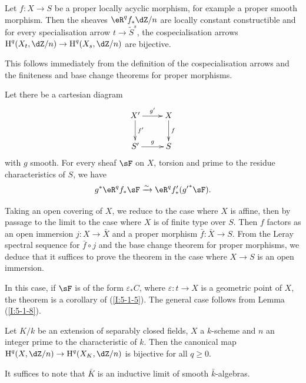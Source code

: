 \begin{theorem}\label{I:5-3-1}
Let $f:X\to S$ be a proper locally acyclic morphism, for example a
proper smooth morphism. Then the sheaves $\eR^q f_*\dZ/n$ are locally
constant constructible and for every specialisation arrow
$t\to\widetilde S^s$, the cospecialisation arrows
$\h^q(X_t,\dZ/n)\to\h^q(X_s,\dZ/n)$ are bijective.
\end{theorem}

This follows immediately from the definition of the
cospecialisation arrows and the finiteness and base change theorems for
proper morphisms. 





\begin{theorem}\label{I:5-3-2}
Let there be a cartesian diagram
\[\xymatrix{
  X' \ar[r]^-{g'} \ar[d]^-{f'}
    & X \ar[d]^-f \\
  S' \ar[r]^-{g}
    & S
}\]
with $g$ smooth. For every sheaf $\sF$ on $X$, torsion and prime to the
residue characteristics of $S$, we have
\[
  g^* \eR^q f_* \sF \iso \eR^q f_*'({g'}^* \sF) \text{.}
\]
\end{theorem}

Taking an open covering of $X$, we reduce to the case where $X$ is
affine, then by passage to the limit to the case where $X$ is of finite type
over $S$. Then $f$ factors as an open immersion $j:X\to \bar X$ and a
proper morphism $\bar f:\bar X\to S$. From the Leray spectral sequence for
$\bar f\circ j$ and the base change theorem for proper morphisms,
we deduce that it suffices to prove the theorem in the case
where $X\to S$ is an open immersion.

In this case, if $\sF$ is of the form $\varepsilon_* C$, where
$\varepsilon:t\to X$ is a geometric point of $X$, the theorem is a
corollary of (\ref{I:5-1-5}). The general case follows from Lemma
(\ref{I:5-1-8}). 





\begin{corollary}\label{I:5-3-3}
Let $K/k$ be an extension of separably closed fields, $X$ a $k$-scheme
and $n$ an integer prime to the characteristic of $k$. Then the canonical
map $\h^q(X,\dZ/n) \to \h^q(X_K,\dZ/n)$ is bijective for all
$q\geqslant 0$.
\end{corollary}

It suffices to note that $\bar K$ is an inductive limit of smooth
$\bar k$-algebras. 





